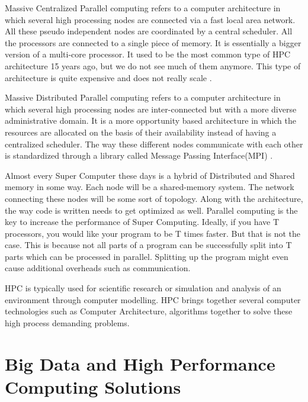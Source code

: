 \documentclass[sigconf]{acmart}
\begin{document}
Massive Centralized Parallel computing refers to a computer architecture in which several high processing nodes are connected via a fast local area network. All these pseudo independent nodes are coordinated by a central scheduler. All the processors are connected to a single piece of memory. It is essentially a bigger version of a multi-core processor. It used to be the most common type of HPC architecture 15 years ago, but we do not see much of them anymore. This type of architecture is quite expensive and does not really scale \cite{grid}. 

Massive Distributed Parallel computing refers to a computer architecture in which several high processing nodes are inter-connected but with a more diverse administrative domain. It is a more opportunity based architecture in which the resources are allocated on the basis of their availability instead of having a centralized scheduler. The way these different nodes communicate with each other is standardized through a library called Message Passing Interface(MPI) \cite{grid}.

Almost every Super Computer these days is a hybrid of Distributed and Shared memory in some way. Each node will be a shared-memory system. The network connecting these nodes will be some sort of topology. Along with the architecture, the way code is written needs to get optimized as well. Parallel computing is the key to increase the performance of Super Computing. Ideally, if you have T processors, you would like your program to be T times faster. But that is not the case. This is because not all parts of a program can be successfully split into T parts which can be processed in parallel. Splitting up the program might even cause additional overheads such as communication. 

HPC is typically used for scientific research or simulation and analysis of an environment through computer modelling. HPC brings together several computer technologies such as Computer Architecture, algorithms together to solve these high process demanding problems. 

\section{Big Data and High Performance Computing Solutions}
\end{document}
